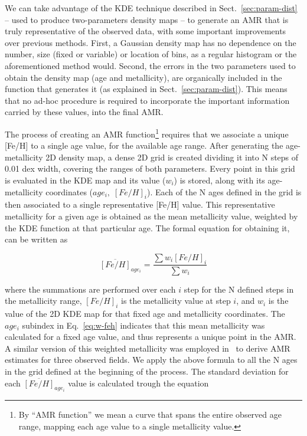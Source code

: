 \documentclass{aa}
\begin{document}
We can take advantage of the KDE technique described in
Sect.~\ref{sec:param-dist} -- used to produce two-parameters density maps -- to
generate an AMR that is truly representative of the observed data, with some
important improvements over previous methods.
%
First, a Gaussian density map has no dependence on the number, size 
(fixed or variable) or location of bins, as a regular histogram or the
aforementioned method would.
Second, the errors in the two parameters used to obtain the density map (age and
metallicity), are organically included in the function that generates it
(as explained in Sect.~\ref{sec:param-dist}).
This means that no ad-hoc procedure is required to incorporate the important
information carried by these values, into the final AMR.\@

The process of creating an AMR function\footnote{By ``AMR function'' we mean a
curve that spans the entire observed age range, mapping each age value
to a single metallicity value.} requires that we associate a unique [Fe/H] to a
single age value, for the available age range.
%
After generating the age-metallicity 2D density map, a dense 2D grid is created
dividing it into N steps of 0.01 dex width, covering the ranges of both
parameters. Every point in this grid is evaluated in the KDE map and its value 
($w_i$) is stored, along with its age-metallicity coordinates ($age_i,\;
[Fe/H]_i$).
Each of the N ages defined in the grid is then associated to a single
representative [Fe/H] value. This representative metallicity for a given age is
obtained as the mean metallicity value, weighted by the KDE function at that
particular age. The formal equation for obtaining it, can be written as

\begin{equation}
\overline{[Fe/H]}_{age_i}=\frac{\sum w_i {[Fe/H]}_i}{\sum w_i}
\label{eq:w-feh}
\end{equation}

\noindent where the summations are performed over each $i$ step for the N
defined steps in the metallicity range, ${[Fe/H]}_i$ is the metallicity value
at step $i$, and $w_i$ is the value of the 2D KDE map for that fixed age and
metallicity coordinates.
The $age_i$ subindex in Eq.~\ref{eq:w-feh} indicates that this mean
metallicity was calculated for a fixed age value, and thus represents a unique
point in the AMR.\@
A similar version of this weighted metallicity was employed 
in~\citet[][see Eq. 3]{Noel_2009} to derive AMR estimates for three observed
fields.
We apply the above formula to all the N ages in the grid defined at the
beginning of the process. The standard deviation for each $\overline{[Fe/H]}_
{age_i}$ value is calculated trough the equation
\end{document}
